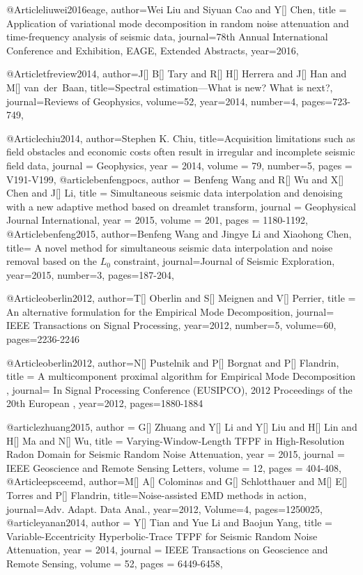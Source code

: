 @Article{liuwei2016eage,
  author={Wei Liu and Siyuan Cao and Y[] Chen},
  title = {Application of variational mode decomposition in random noise attenuation and time-frequency analysis of seismic data},
  journal={78th Annual International Conference and Exhibition, EAGE, Extended Abstracts},
  year=2016,
  }
  
@Article{tfreview2014,
author={J[] B[] Tary and R[] H[] Herrera and J[] Han and M[] van~der~Baan},
title={Spectral estimation—What is new? What is next?},
journal={Reviews of Geophysics},
volume=52,
year=2014,
number=4,
pages={723-749},
}

@Article{chiu2014,
  author={Stephen K. Chiu},
  title={Acquisition limitations such as field obstacles and economic costs often result in irregular and incomplete seismic field data},
  journal = 	 {Geophysics},
  year = 	 2014,
  volume =	 79,
  number=5,
  pages =	 {V191-V199},
}
@article{benfengpocs,
  author =	 {Benfeng Wang and R[] Wu and X[] Chen and J[] Li},
  title =	 {Simultaneous seismic data interpolation and denoising with a new adaptive method based on dreamlet transform},
  journal = 	 {Geophysical Journal International},
  year = 	 2015,
  volume =	 201,
  pages =	 {1180-1192},
}
@Article{benfeng2015,
  author={Benfeng Wang and Jingye Li and Xiaohong Chen},
  title={ A novel method for simultaneous seismic data interpolation and noise removal based on the $L_0$ constraint},
  journal={Journal of Seismic Exploration},
  year=2015,
  number=3,
  pages={187-204},
}

@Article{oberlin2012,
  author={T[] Oberlin and S[] Meignen and V[] Perrier},
  title = { An alternative formulation for the Empirical Mode Decomposition},
  journal={ IEEE Transactions on Signal Processing},
  year=2012,
  number=5,
  volume=60,
  pages=2236-2246}

@Article{oberlin2012,
  author={N[] Pustelnik and P[] Borgnat and P[] Flandrin},
  title = { A multicomponent proximal algorithm for Empirical Mode Decomposition },
  journal={  In Signal Processing Conference (EUSIPCO), 2012 Proceedings of the 20th European },
  year=2012,
  pages=1880-1884}
  
@article{zhuang2015,
  author =	 {G[] Zhuang and Y[] Li and Y[] Liu and H[] Lin and H[] Ma and N[] Wu},
  title =	 {Varying-Window-Length {TFPF} in High-Resolution Radon Domain for Seismic Random Noise Attenuation},
  year =	 2015,
  journal =	 {IEEE Geoscience and Remote Sensing Letters},
  volume =	 12,
  pages =	 {404-408},
}
@Article{epsceemd,
  author={M[] A[] Colominas and G[] Schlotthauer and M[] E[] Torres and P[] Flandrin},
  title={Noise-assisted {EMD} methods in action},
  journal={Adv. Adapt. Data Anal.},
  year=2012,
  Volume=4,
  pages={1250025},
}
@article{yanan2014,
  author =	 {Y[] Tian and Yue Li and Baojun Yang},
  title =	 {Variable-Eccentricity Hyperbolic-Trace {TFPF} for Seismic Random Noise Attenuation},
  year =	 2014,
  journal =	 {IEEE Transactions on Geoscience and Remote Sensing},
  volume =	 52,
  pages =	 {6449-6458},
}



